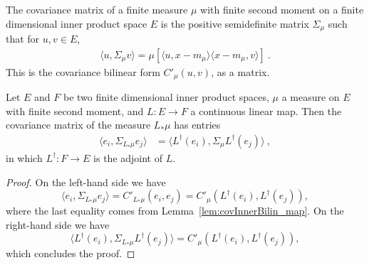 \begin{definition}\label{def:covMatrix}
  \leanok
The covariance matrix of a finite measure $\mu$ with finite second moment on a finite dimensional inner product space $E$ is the positive semidefinite matrix $\Sigma_\mu$ such that for $u, v \in E$,
\begin{align*}
  \langle u, \Sigma_\mu v\rangle = \mu[\langle u, x - m_\mu \rangle \langle x - m_\mu, v \rangle] \: .
\end{align*}
This is the covariance bilinear form $C'_\mu(u, v)$, as a matrix.
\end{definition}


\begin{lemma}\label{lem:covMatrix_map}
  \leanok
Let $E$ and $F$ be two finite dimensional inner product spaces, $\mu$ a measure on $E$ with finite second moment, and $L : E \to F$ a continuous linear map.
Then the covariance matrix of the measure $L_*\mu$ has entries
\begin{align*}
  \langle e_i, \Sigma_{L_*\mu} e_j\rangle
  &= \langle L^\dagger(e_i), \Sigma_\mu L^\dagger(e_j)\rangle
  \: ,
\end{align*}
in which $L^\dagger : F \to E$ is the adjoint of $L$.
\end{lemma}

\begin{proof}\leanok
  On the left-hand side we have
  $$\langle e_i, \Sigma_{L_*\mu} e_j\rangle = C'_{L_*\mu}(e_i, e_j) = C'_\mu(L^\dagger(e_i), L^\dagger(e_j)),$$
  where the last equality comes from Lemma~\ref{lem:covInnerBilin_map}. On the right-hand side we have
  $$\langle L^\dagger(e_i), \Sigma_{L_*\mu} L^\dagger(e_j)\rangle = C'_\mu(L^\dagger(e_i), L^\dagger(e_j)),$$
  which concludes the proof.
\end{proof}
